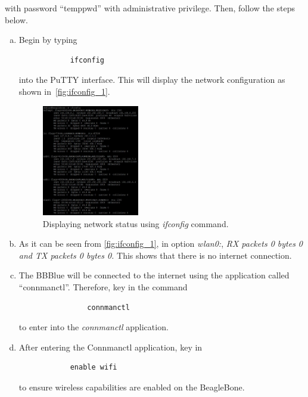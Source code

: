 with password ``temppwd'' with administrative privilege. Then, follow the steps
below.  

\begin{enumerate}[a)]
    \item Begin by typing 
         \begin{verbatim}
            ifconfig
         \end{verbatim}
         into the PuTTY interface. This will display the network configuration as shown in~\autoref{fig:ifconfig_1}. 
         
    \begin{figure}
        \centering
        \includegraphics[width= 0.4\textwidth]{figs/img/Lab0/ifconfig_1.JPG}
        \caption{Displaying network status using \emph{ifconfig} command.}
        \label{fig:ifconfig_1}
    \end{figure} 

    \item As it can be seen from \autoref{fig:ifconfig_1}, in option \emph{wlan0:},
    \emph{RX packets 0 bytes 0 and TX packets 0 bytes 0.} This shows that there is
    no internet connection.

    
    \item The BBBlue will be connected to the internet using the application called
    ``connmanctl''. Therefore, key in the command
            \begin{verbatim}
                connmanctl
            \end{verbatim}
        to enter into the \emph{connmanctl} application.
    
    \item After entering the Connmanctl application, key in
        \begin{verbatim}
            enable wifi
        \end{verbatim}
    to ensure wireless capabilities are enabled on the BeagleBone.
    

\end{enumerate}
